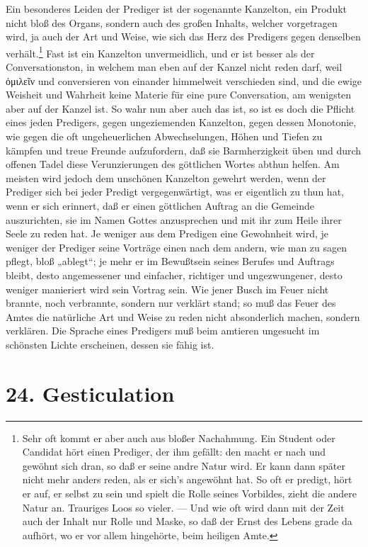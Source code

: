 Ein besonderes Leiden der Prediger ist der sogenannte Kanzelton, ein Produkt nicht bloß des Organs, sondern auch des großen Inhalts, welcher vorgetragen wird, ja auch der Art und Weise, wie sich das Herz des Predigers gegen denselben verhält.\footnote{Sehr oft kommt er aber auch aus bloßer Nachahmung. Ein Student oder Candidat hört einen Prediger, der ihm gefällt: den macht er nach und gewöhnt sich dran, so daß er seine andre Natur wird. Er kann dann später nicht mehr anders reden, als er sich’s angewöhnt hat. So oft er predigt, hört er auf, er selbst zu sein und spielt die Rolle seines Vorbildes, zieht die andere Natur an. Trauriges Loos so vieler. — Und wie oft wird dann mit der Zeit auch der Inhalt nur Rolle und Maske, so daß der Ernst des Lebens grade da aufhört, wo er vor allem hingehörte, beim heiligen Amte.} Fast ist ein Kanzelton unvermeidlich, und
er ist besser als der Conversationston, in welchem man eben auf der Kanzel nicht reden darf, weil ὁμιλεῖν und conversieren von einander himmelweit verschieden sind, und die ewige Weisheit und Wahrheit keine Materie für eine pure Conversation, am wenigsten aber auf der Kanzel ist. So wahr nun aber auch das ist, so ist es doch die Pflicht eines jeden Predigers, gegen ungeziemenden Kanzelton, gegen dessen Monotonie, wie gegen die oft ungeheuerlichen Abwechselungen, Höhen und Tiefen zu kämpfen und treue Freunde aufzufordern, daß sie Barmherzigkeit üben und durch offenen Tadel diese Verunzierungen des göttlichen Wortes abthun helfen. Am meisten wird jedoch dem unschönen Kanzelton gewehrt werden, wenn der Prediger sich bei jeder Predigt vergegenwärtigt, was er eigentlich zu thun hat, wenn er sich erinnert, daß er einen göttlichen Auftrag an die Gemeinde auszurichten, sie im Namen Gottes anzusprechen und mit ihr zum Heile ihrer Seele zu reden hat. Je weniger aus dem Predigen eine Gewohnheit wird, je weniger der Prediger seine Vorträge einen nach dem andern, wie man zu sagen pflegt, bloß „ablegt“; je mehr er im Bewußtsein seines Berufes und Auftrags bleibt, desto angemessener und einfacher, richtiger und ungezwungener, desto weniger manieriert wird sein Vortrag sein. Wie jener Busch im Feuer
nicht brannte, noch verbrannte, sondern nur verklärt stand; so muß das Feuer des Amtes die natürliche Art und Weise zu reden nicht absonderlich machen, sondern verklären. Die Sprache eines Predigers muß beim amtieren ungesucht im schönsten Lichte erscheinen, dessen sie fähig ist.

\section{24. Gesticulation}

